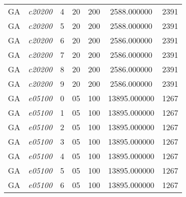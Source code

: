 {\begin{longtable}{cc|c|cc|cc}
			GA                 & \textit{c20200}    & 4                               & 20               & 200              & 2588.000000                          & 2391 \\  
			GA                 & \textit{c20200}    & 5                               & 20               & 200              & 2588.000000                          & 2391 \\  
			GA                 & \textit{c20200}    & 6                               & 20               & 200              & 2586.000000                          & 2391 \\  
			GA                 & \textit{c20200}    & 7                               & 20               & 200              & 2586.000000                          & 2391 \\  
			GA                 & \textit{c20200}    & 8                               & 20               & 200              & 2586.000000                          & 2391 \\  
			GA                 & \textit{c20200}    & 9                               & 20               & 200              & 2586.000000                          & 2391 \\  \hline
			GA                 & \textit{e05100}    & 0                               & 05               & 100              & 13895.000000                          & 1267 \\ 
			GA                 & \textit{e05100}    & 1                               & 05               & 100              & 13895.000000                          & 1267 \\ 
			GA                 & \textit{e05100}    & 2                               & 05               & 100              & 13895.000000                          & 1267 \\ 
			GA                 & \textit{e05100}    & 3                               & 05               & 100              & 13895.000000                          & 1267 \\ 
			GA                 & \textit{e05100}    & 4                               & 05               & 100              & 13895.000000                          & 1267 \\ 
			GA                 & \textit{e05100}    & 5                               & 05               & 100              & 13895.000000                          & 1267 \\ 
			GA                 & \textit{e05100}    & 6                               & 05               & 100              & 13895.000000                          & 1267 \\ 

\end{longtable}}
